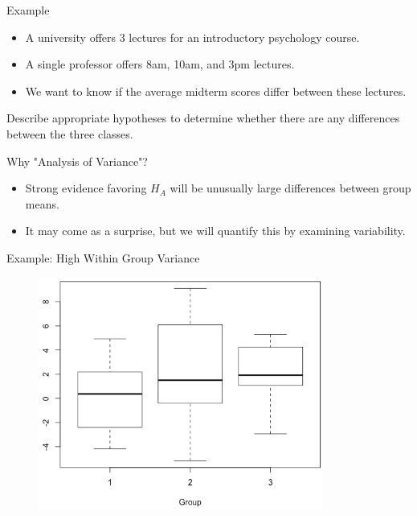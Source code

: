 \begin{frame}{Example}
    \begin{itemize}
        \item A university offers 3 lectures for an introductory psychology course.
        \item A single professor offers 8am, 10am, and 3pm lectures.
        \item We want to know if the average midterm scores differ between these lectures.
    \end{itemize}
    Describe appropriate hypotheses to determine whether there are any differences between the three classes.
\end{frame}

\begin{frame}{Why "Analysis of Variance"?}
    \begin{itemize}
        \item Strong evidence favoring $H_A$ will be unusually large differences between group means. 
        \item It may come as a surprise, but we will quantify this by examining variability.
    \end{itemize}
\end{frame}

\begin{frame}{Example: High Within Group Variance}
    \begin{figure}
        \centering
        \includegraphics[height=3in]{images/highvar.png}
    \end{figure}
\end{frame}

